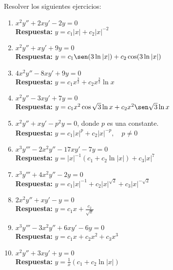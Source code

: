 Resolver los siguientes ejercicios:

\begin{enumerate}
    \item $x^2 y'' + 2xy' - 2y = 0$  \\
    \textbf{Respuesta:} $y = c_1 |x| + c_2 |x|^{-2}$
    
    \item $x^2 y'' + xy' + 9y = 0$  \\
    \textbf{Respuesta:} $y = c_1 \sen(3 \ln |x|) + c_2 \cos(3 \ln |x|)$
    
    \item $4x^2 y'' - 8xy' + 9y = 0$  \\
    \textbf{Respuesta:} $y = c_1 x^{\frac{3}{2}} + c_2 x^{\frac{3}{2}} \ln x$
    
    \item $x^2 y'' - 3xy' + 7y = 0$  \\
    \textbf{Respuesta:} $y = c_1 x^2 \cos \sqrt{3} \ln x + c_2 x^2 \sen \sqrt{3} \ln x$
    
    \item $x^2 y'' + xy' - p^2 y = 0$, donde $p$ es una constante.  \\
    \textbf{Respuesta:} $y = c_1 |x|^p + c_2 |x|^{-p}, \quad p \neq 0$
    
    \item $x^3 y''' - 2x^2 y'' - 17xy' - 7y = 0$  \\
    \textbf{Respuesta:} $y = |x|^{-1} (c_1 + c_2 \ln |x|) + c_3 |x|^7$
    
    \item $x^3 y''' + 4x^2 y'' - 2y = 0$  \\
    \textbf{Respuesta:} $y = c_1 |x|^{-1} + c_2 |x|^{\sqrt{2}} + c_3 |x|^{-\sqrt{2}}$
    
    \item $2x^2 y'' + xy' - y = 0$  \\
    \textbf{Respuesta:} $y = c_1 x + \frac{c_2}{\sqrt{x}}$
    
    \item $x^3 y''' - 3x^2 y'' + 6xy' - 6y = 0$  \\
    \textbf{Respuesta:} $y = c_1 x + c_2 x^2 + c_3 x^3$
    
    \item $x^2 y'' + 3xy' + y = 0$  \\
    \textbf{Respuesta:} $y = \frac{1}{x} (c_1 + c_2 \ln |x|)$
\end{enumerate}
